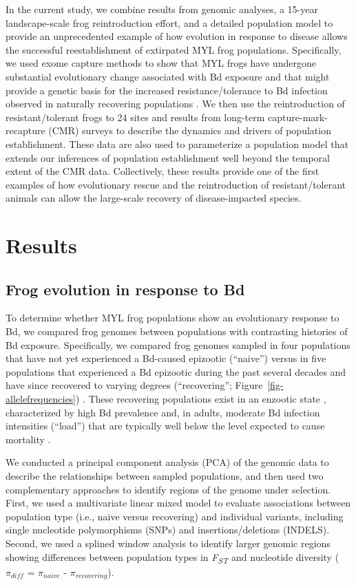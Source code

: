 \documentclass[9pt,twocolumn,twoside,lineno]{pnas-new}
\begin{document}
In the current study, we combine results from genomic analyses, a
15-year landscape-scale frog reintroduction effort, and a detailed
population model to provide an unprecedented example of how evolution in
response to disease allows the successful reestablishment of extirpated
MYL frog populations. Specifically, we used exome capture methods to
show that MYL frogs have undergone substantial evolutionary change
associated with Bd exposure and that might provide a genetic basis for
the increased resistance/tolerance to Bd infection observed in naturally
recovering populations \citep{knapp2016}. We then use the reintroduction
of resistant/tolerant frogs to 24 sites and results from long-term
capture-mark-recapture (CMR) surveys to describe the dynamics and
drivers of population establishment. These data are also used to
parameterize a population model that extends our inferences of
population establishment well beyond the temporal extent of the CMR
data. Collectively, these results provide one of the first examples of
how evolutionary rescue and the reintroduction of resistant/tolerant
animals can allow the large-scale recovery of disease-impacted species.

\section*{Results}

\subsection*{Frog evolution in response to Bd}

To determine whether MYL frog populations show an evolutionary response
to Bd, we compared frog genomes between populations with contrasting
histories of Bd exposure. Specifically, we compared frog genomes sampled
in four populations that have not yet experienced a Bd-caused epizootic
(``naive'') \citep{zhou2015} versus in five populations that experienced
a Bd epizootic during the past several decades and have since recovered
to varying degrees (``recovering''; Figure~\ref{fig-allelefrequencies})
\citep{knapp2016, vredenburg2010}. These recovering populations exist in
an enzootic state \citep{briggs2010}, characterized by high Bd
prevalence and, in adults, moderate Bd infection intensities (``load'')
that are typically well below the level expected to cause mortality
\citep{vredenburg2010}.

We conducted a principal component analysis (PCA) of the genomic data to
describe the relationships between sampled populations, and then used
two complementary approaches to identify regions of the genome under
selection. First, we used a multivariate linear mixed model to evaluate
associations between population type (i.e., naive versus recovering) and
individual variants, including single nucleotide polymorphisms (SNPs)
and insertions/deletions (INDELS). Second, we used a splined window
analysis to identify larger genomic regions showing differences between
population types in \emph{F\textsubscript{ST}} and nucleotide diversity
(\(\pi_{diff}\) = \(\pi_{naive}\) - \(\pi_{recovering}\)).
\end{document}
